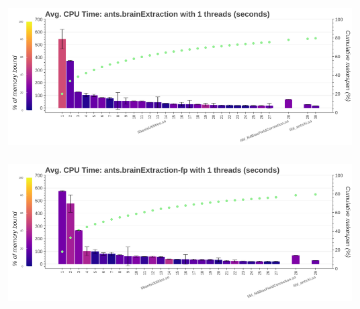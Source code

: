 \documentclass[conference]{IEEEtran}
\begin{document}
\begin{figure}[ht!]
	\centering
	\begin{subfigure}[t]{0.49\textwidth}
		\caption{}
		\label{subfig:hotspots-ants-brainExtraction}
		\includegraphics[width=\textwidth]{figures/hotspots-1thread-ants-brainExtraction.png}
	\end{subfigure}
	\hfill
	\begin{subfigure}[t]{0.49\textwidth}
		\caption{}
		\label{subfig:hotspots-ants-brainExtraction-fp}
		\includegraphics[width=\textwidth]{figures/hotspots-1thread-ants-brainExtraction-fp.png}
	\end{subfigure}
																																																																				

\end{figure}
\end{document}
